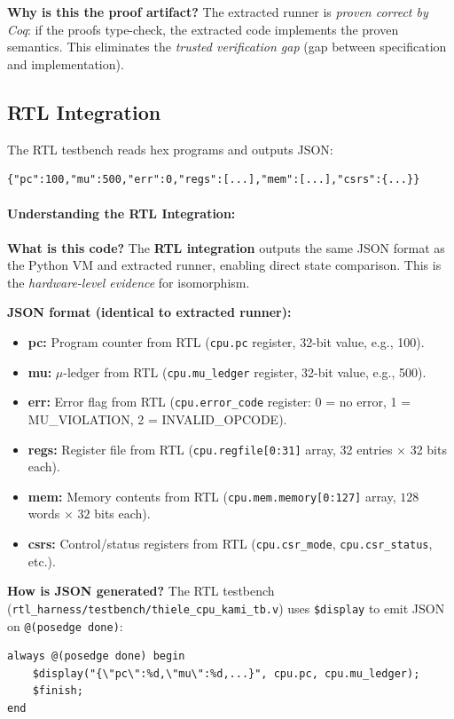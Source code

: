 \textbf{Why is this the proof artifact?} The extracted runner is \textit{proven correct by Coq}: if the proofs type-check, the extracted code implements the proven semantics. This eliminates the \textit{trusted verification gap} (gap between specification and implementation).


\subsection{RTL Integration}

The RTL testbench reads hex programs and outputs JSON:
\begin{lstlisting}
{"pc":100,"mu":500,"err":0,"regs":[...],"mem":[...],"csrs":{...}}
\end{lstlisting}

\paragraph{Understanding the RTL Integration:}

\textbf{What is this code?} The \textbf{RTL integration} outputs the same JSON format as the Python VM and extracted runner, enabling direct state comparison. This is the \textit{hardware-level evidence} for isomorphism.

\textbf{JSON format (identical to extracted runner):}
\begin{itemize}
    \item \textbf{pc:} Program counter from RTL (\texttt{cpu.pc} register, 32-bit value, e.g., 100).
    \item \textbf{mu:} $\mu$-ledger from RTL (\texttt{cpu.mu\_ledger} register, 32-bit value, e.g., 500).
    \item \textbf{err:} Error flag from RTL (\texttt{cpu.error\_code} register: 0 = no error, 1 = MU\_VIOLATION, 2 = INVALID\_OPCODE).
    \item \textbf{regs:} Register file from RTL (\texttt{cpu.regfile[0:31]} array, 32 entries $\times$ 32 bits each).
    \item \textbf{mem:} Memory contents from RTL (\texttt{cpu.mem.memory[0:127]} array, $128$ words $\times$ $32$ bits each).
    \item \textbf{csrs:} Control/status registers from RTL (\texttt{cpu.csr\_mode}, \texttt{cpu.csr\_status}, etc.).
\end{itemize}

\textbf{How is JSON generated?} The RTL testbench (\texttt{rtl\_harness/testbench/thiele\_cpu\_kami\_tb.v}) uses \texttt{\$display} to emit JSON on \texttt{@(posedge done)}:
\begin{verbatim}
always @(posedge done) begin
    $display("{\"pc\":%d,\"mu\":%d,...}", cpu.pc, cpu.mu_ledger);
    $finish;
end
\end{verbatim}

